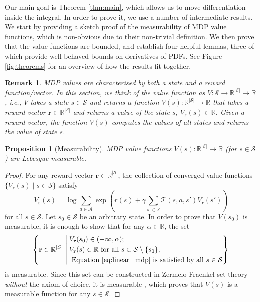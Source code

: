 \documentclass{mpaper}
\newtheorem{proposition}[theorem]{Proposition}
\newtheorem{remark}[theorem]{Remark}
\newcommand{\V}{V_{\mathbf{r}}}
\begin{document}
Our main goal is Theorem \ref{thm:main}, which allows us to move differentiation
inside the integral. In order to prove it, we use a number of intermediate
results. We start by providing a sketch proof of the measurability of MDP value
functions, which is non-obvious due to their non-trivial definition. We then
prove that the value functions are bounded, and establish four helpful lemmas,
three of which provide well-behaved bounds on derivatives of PDFs. See Figure
\ref{fig:theorems} for an overview of how the results fit together.

\begin{remark}
  MDP values are characterised by both a state and a reward function/vector. In
  this section, we think of the value function as $V : \mathcal{S} \to
  \mathbb{R}^{|\mathcal{S}|} \to \mathbb{R}$, i.e., $V$ takes a state $s \in
  \mathcal{S}$ and returns a function $V(s) : \mathbb{R}^{|\mathcal{S}|} \to
  \mathbb{R}$ that takes a reward vector $\mathbf{r} \in
  \mathbb{R}^{|\mathcal{S}|}$ and returns a value of the state $s$, $\V(s) \in
  \mathbb{R}$. Given a reward vector, the function $V(s)$ computes the values of
  all states and returns the value of state $s$.
\end{remark}

\begin{proposition}[Measurability] \label{thm:measurability}
  MDP value functions $V(s) : \mathbb{R}^{|\mathcal{S}|} \to \mathbb{R}$ (for $s
  \in \mathcal{S}$) are Lebesgue measurable.
\end{proposition}
\begin{proof}
  For any reward vector $\mathbf{r} \in \mathbb{R}^{|\mathcal{S}|}$, the
  collection of converged value functions $\{ \V(s) \mid s \in
  \mathcal{S} \}$ satisfy
  \begin{equation} \label{eq:linear_mdp}
    \V(s) = \log \sum_{a \in \mathcal{A}}
    \exp\left( r(s) + \gamma\sum_{s' \in \mathcal{S}} \mathcal{T}(s, a,
      s')\V(s') \right)
  \end{equation}
  for all $s \in \mathcal{S}$. Let $s_0 \in \mathcal{S}$ be an arbitrary state.
  In order to prove that $V(s_0)$ is measurable, it is enough to show that for
  any $\alpha \in \mathbb{R}$, the set
  \[
    \left\{ \mathbf{r} \in \mathbb{R}^{|\mathcal{S}|} \; \middle|
    \begin{aligned}
      \;&\V(s_0) \in (-\infty, \alpha); \\
      \;&\V(s) \in \mathbb{R} \text{ for all } s \in \mathcal{S} \setminus \{ s_0 \}; \\
      \;&\text{ Equation \ref{eq:linear_mdp} is satisfied by all } s \in
      \mathcal{S}
    \end{aligned}
    \right\}
  \]
  is measurable. Since this set can be constructed in Zermelo-Fraenkel set
  theory \emph{without} the axiom of choice, it is measurable
  \cite{herrlich2006axiom}, which proves that $V(s)$ is a measurable function
  for any $s \in \mathcal{S}$.
\end{proof}
\end{document}
